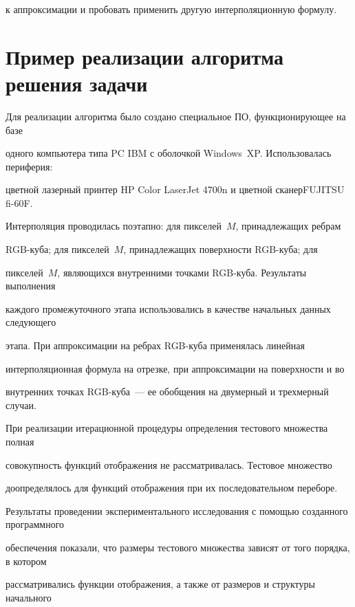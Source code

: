 к аппроксимации и пробовать применить другую интерполяционную формулу.





\section{Пример реализации алгоритма решения задачи}





Для реализации алгоритма было создано специальное ПО, функционирующее на базе


одного компьютера типа PC  IBM с  оболочкой Windows~XP. Использовалась периферия:


цветной лазерный принтер HP Color LaserJet 4700n и цветной сканер\linebreak FUJITSU fi-60F.


Интерполяция проводилась поэтапно: для пикселей~$M$, принадлежащих ребрам


RGB-ку\-ба; для пикселей~$M$, принадлежащих поверхности RGB-ку\-ба; для


пикселей~$M$, являющихся внутренними точками RGB-куба. Результаты выполнения


каж\-до\-го промежуточного этапа использовались в качестве начальных данных следующего


этапа. При аппроксимации на ребрах RGB-ку\-ба применялась линейная


интерполяционная формула на отрезке, при аппроксимации на поверхности и во


внутренних точках RGB-ку\-ба~--- ее обобщения на двумерный и трехмерный случаи.





При реализации итерационной процедуры определения тес\-то\-во\-го множества полная


совокупность функций отображения не рассматривалась. Тестовое множество


доопределялось для функций отображения при их последовательном переборе.





Результаты проведении экспериментального исследования с помощью созданного программного


обеспечения показали, что размеры тестового множества зависят от того порядка, в котором


рассматривались функции отображения, а также от размеров и структуры начального


